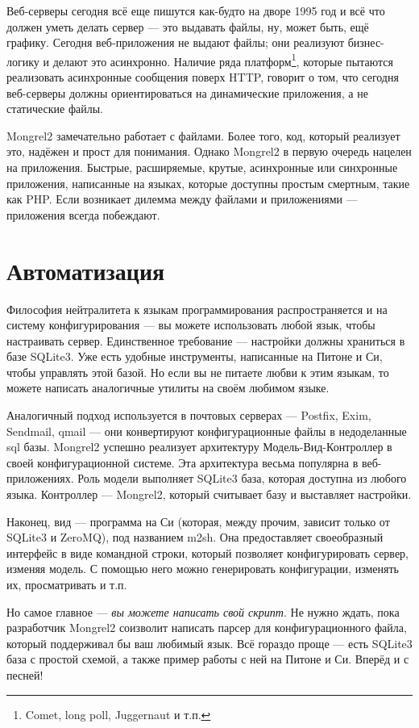 Веб-серверы сегодня всё еще пишутся как-будто на дворе 1995 год и всё что должен уметь
делать сервер --- это выдавать файлы, ну, может быть, ещё графику. Сегодня веб-приложения
не выдают файлы; они реализуют бизнес-логику и делают это асинхронно. Наличие ряда
платформ\footnote{Comet, long poll, Juggernaut и т.п.}, которые пытаются реализовать
асинхронные сообщения поверх HTTP, говорит о том,
что сегодня веб-серверы должны ориентироваться на динамические приложения, а не
статические файлы.

Mongrel2 замечательно работает с файлами. Более того, код, который реализует это,
надёжен и прост для понимания. Однако Mongrel2 в первую очередь нацелен на приложения.
Быстрые, расширяемые, крутые, асинхронные или синхронные приложения, написанные на
языках, которые доступны простым смертным, такие как PHP. Если возникает дилемма
между файлами и приложениями --- приложения всегда побеждают.

\section{Автоматизация}

Философия нейтралитета к языкам программирования распространяется и на систему
конфигурирования --- вы можете использовать любой язык, чтобы настраивать
сервер.  Единственное требование --- настройки должны храниться в базе SQLite3.
Уже есть удобные инструменты, написанные на Питоне и Си, чтобы управлять этой
базой. Но если вы не питаете любви к этим языкам, то можете написать
аналогичные утилиты на своём любимом языке.

Аналогичный подход используется в почтовых серверах --- Postfix, Exim, Sendmail, qmail ---
они конвертируют конфигурационные файлы в недоделанные sql базы.
Mongrel2 успешно реализует архитектуру Модель-Вид-Контроллер в своей конфигурационной
системе. Эта архитектура весьма популярна в веб-приложениях. Роль модели выполняет
SQLite3 база, которая доступна из любого языка. Контроллер --- Mongrel2,
который считывает базу и выставляет настройки.

Наконец, вид --- программа на Си (которая, между прочим, зависит только от
SQLite3 и ZeroMQ), под названием m2sh. Она предоставляет своеобразный интерфейс
в виде командной строки, который позволяет конфигурировать сервер, изменяя
модель. С помощью него можно генерировать конфигурации, изменять их,
просматривать и т.п.

Но самое главное --- \emph{вы можете написать свой скрипт}. Не нужно ждать,
пока разработчик Mongrel2 соизволит написать парсер для конфигурационного
файла, который поддерживал бы ваш любимый язык. Всё гораздо проще --- есть
SQLite3 база с простой схемой, а также пример работы с ней на Питоне и Си.
Вперёд и с песней!

